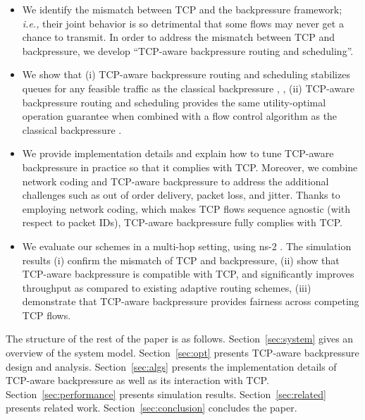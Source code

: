 \documentclass[conference]{IEEEtran}
\newcommand{\ie}{{\em i.e., }}
\begin{document}
\begin{itemize}
\item We identify the mismatch between TCP and the backpressure framework; \ie their joint behavior is so detrimental that some flows may never get a chance to transmit. In order to address the mismatch between TCP and backpressure, we develop ``TCP-aware backpressure routing and scheduling''.
\item We show that (i) TCP-aware backpressure routing and scheduling stabilizes queues for any feasible traffic as the classical backpressure \cite{tass_eph1}, \cite{tass_eph2}, (ii) TCP-aware backpressure routing and scheduling provides the same utility-optimal operation guarantee when combined with a flow control algorithm as the classical backpressure \cite{neely_mod}.
\item We provide implementation details and explain how to tune TCP-aware backpressure in practice so that it complies with TCP. Moreover, we combine network coding and TCP-aware backpressure to address the additional challenges such as out of order delivery, packet loss, and jitter. Thanks to employing network coding, which makes TCP flows sequence agnostic (with respect to packet IDs), TCP-aware backpressure fully complies with TCP.
\item We evaluate our schemes in a multi-hop setting, using ns-2 \cite{ns2}. The simulation results (i) confirm the mismatch of TCP and backpressure, (ii) show that TCP-aware backpressure is compatible with TCP, and significantly improves throughput as compared to existing adaptive routing schemes, (iii) demonstrate that TCP-aware backpressure provides fairness across competing TCP flows. \end{itemize}

The structure of the rest of the paper is as follows. Section~\ref{sec:system} gives an overview of the system model. Section~\ref{sec:opt} presents TCP-aware backpressure design and analysis. Section~\ref{sec:algs} presents the implementation details of TCP-aware backpressure as well as its interaction with TCP. Section~\ref{sec:performance} presents simulation results.
Section~\ref{sec:related} presents related work. Section~\ref{sec:conclusion} concludes the paper.
\end{document}
